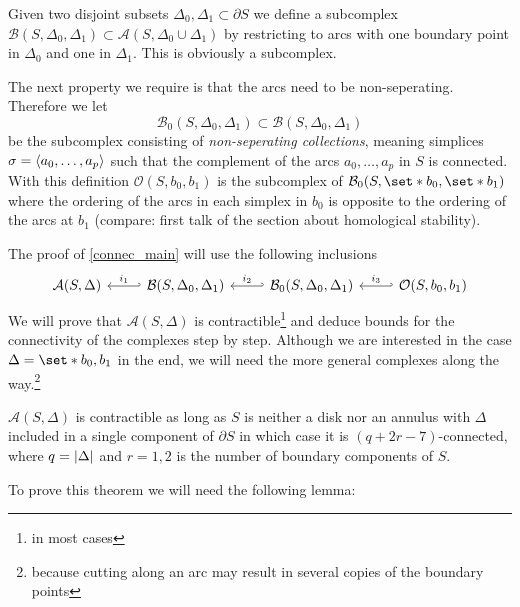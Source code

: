 Given two disjoint subsets $\Delta_0, \Delta_1 \subset \partial S$ we define a subcomplex $\mathcal{B}(S,\Delta_0,\Delta_1) \subset \mathcal{A}(S,\Delta_0 \cup \Delta_1)$ by restricting to arcs with one boundary point in $\Delta_0$ and one in $\Delta_1$.
This is obviously a subcomplex.

The next property we require is that the arcs need to be non-seperating.
Therefore we let 
\[
	\mathcal{B}_0(S,\Delta_0, \Delta_1) \subset \mathcal{B}(S,\Delta_0, \Delta_1) 
\]
be the subcomplex consisting of \emph{non-seperating collections}, meaning simplices $\sigma = \angbrace{a_0, \ldots ,a_p}$ such that the complement of the arcs $a_0, \ldots ,a_p$ in $S$ is connected.
With this definition $\mathcal{O}(S,b_0,b_1)$ is the subcomplex of $\mathcal{B}_0(S,\set*{b_0},\set*{b_1})$ where the ordering of the arcs in each simplex in $b_0$ is opposite to the ordering of the arcs at $b_1$ (compare: first talk of the section about homological stability).

The proof of \autoref{connec_main} will use the following inclusions
\[
	\begin{tikzcd}
		\mathcal{A}(S,\Delta) & \mathcal{B}(S, \Delta_0, \Delta_1) \lar["i_1"',hook'] & \mathcal{B}_0(S,\Delta_0,\Delta_1) \lar["i_2"',hook'] & \mathcal{O}(S,b_0,b_1) \lar["i_3"',hook']
	\end{tikzcd}
\]
We will prove that $\mathcal{A}(S,\Delta)$ is contractible\footnote{in most cases} and deduce bounds for the connectivity of the complexes step by step.
Although we are interested in the case $\Delta=\set*{b_0,b_1}$ in the end, we will need the more general complexes along the way.\footnote{because cutting along an arc may result in several copies of the boundary points}

\begin{theorem}[label=thm:connec_full]
	$\mathcal{A}(S,\Delta)$ is contractible as long as $S$ is neither a disk nor an annulus with $\Delta$ included in a single component of $\partial S$ in which case it is $(q+2r-7)$-connected, where $q=\abs*{\Delta}$ and $r=1,2$ is the number of boundary components of $S$.
\end{theorem}

To prove this theorem we will need the following lemma:

